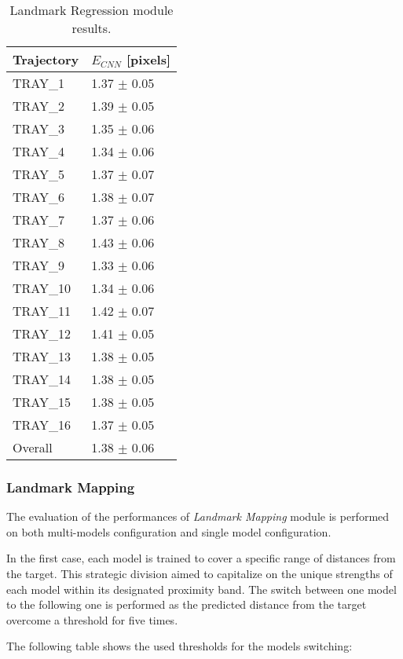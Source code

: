 \begin{table}[H]
\label{tab:2DErrorResultsTrain}
\centering
\begin{tabular}{l | l }
\toprule
Trajectory & $E_{CNN}$ [pixels]\\
\midrule
TRAY\_1 & 1.37 $\pm$ 0.05 \\
TRAY\_2 & 1.39 $\pm$ 0.05 \\
TRAY\_3 & 1.35 $\pm$ 0.06 \\
TRAY\_4 & 1.34 $\pm$ 0.06 \\
TRAY\_5 & 1.37 $\pm$ 0.07 \\
TRAY\_6 & 1.38 $\pm$ 0.07 \\
TRAY\_7 & 1.37 $\pm$ 0.06 \\
TRAY\_8 & 1.43 $\pm$ 0.06 \\
TRAY\_9 & 1.33 $\pm$ 0.06 \\
TRAY\_10 & 1.34 $\pm$ 0.06 \\
TRAY\_11 & 1.42 $\pm$ 0.07 \\
TRAY\_12 & 1.41 $\pm$ 0.05 \\
TRAY\_13 & 1.38 $\pm$ 0.05 \\
TRAY\_14 & 1.38 $\pm$ 0.05 \\
TRAY\_15 & 1.38 $\pm$ 0.05 \\
TRAY\_16 & 1.37 $\pm$ 0.05 \\
\midrule
Overall & 1.38 $\pm$ 0.06\\
\bottomrule
\end{tabular}
\caption{Landmark Regression module results.}
\end{table}

\subsubsection{Landmark Mapping}

The evaluation of the performances of \textit{Landmark Mapping} module is performed on both multi-models configuration and single model configuration.

In the first case, each model is trained to cover a specific range of distances from the target. This strategic division aimed to capitalize on the unique strengths of each model within its designated proximity band. The switch between one model to the following one is performed as the predicted distance from the target overcome a threshold for five times.

The following table shows the used thresholds for the models switching:

